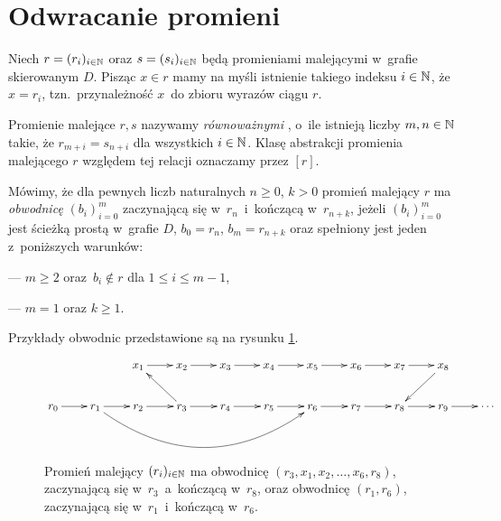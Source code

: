 

\section{Odwracanie promieni}\label{reversing}
Niech $r=(r_i)_{i\in\mathbb{N}}$ oraz $s=(s_i)_{i\in\mathbb{N}}$ będą promieniami malejącymi w~grafie skierowanym $D$. Pisząc $x\in r$ mamy na myśli istnienie takiego indeksu $i\in\mathbb{N}$, że $x=r_i$, tzn.~przynależność $x$~do zbioru wyrazów ciągu $r$.

Promienie malejące $r, s$ nazywamy \textit{równoważnymi} \cite{Ayala11}, o~ile istnieją liczby $m,n\in\mathbb{N}$ takie, że $r_{m+i}=s_{n+i}$ dla wszystkich $i\in\mathbb{N}$. Klasę abstrakcji promienia malejącego $r$ względem tej relacji oznaczamy przez $[r]$.

Mówimy, że dla pewnych liczb naturalnych $n\geq 0$, $k>0$ promień malejący $r$ ma \textit{obwodnicę} $(b_i)_{i=0}^{m}$ zaczynającą się w~$r_n$~i~kończącą w~$r_{n+k}$, jeżeli $(b_i)_{i=0}^{m}$ jest ścieżką prostą w~grafie $D$, $b_0=r_n$, $b_m=r_{n+k}$ oraz spełniony jest jeden z~poniższych warunków:
\begin{compactitem}
\item[---] $m\geq 2$ oraz~$b_i\not\in r$ dla $1\leq i\leq m-1$,
\item[---] $m=1$ oraz $k\geq 1$.
\end{compactitem}

Przykłady obwodnic przedstawione są na rysunku \ref{fig-bypass}. 

\begin{figure}[h]
\centering
$\xymatrix@C=22pt{
& & x_1\ar[r] & x_2\ar[r]& x_3\ar[r]& x_4\ar[r] & x_5\ar[r] & x_6\ar[r] & x_7\ar[r] & x_8\ar[dl] \\ 
r_0\ar[r] & r_1\ar[r]\ar@/_3pc/[rrrrr] & r_2\ar[r] & r_3\ar[r]\ar[ul] & r_4\ar[r] & r_5\ar[r] & r_6\ar[r] & r_7\ar[r] & r_8\ar[r] & r_9\ar[r] & \cdots \\\\}$
\caption{Promień malejący $(r_i)_{i\in\mathbb{N}}$ ma obwodnicę $(r_3,x_1,x_2,\ldots,x_6,r_8)$, zaczynającą się w~$r_3$~a~kończącą w~$r_8$, oraz obwodnicę $(r_1,r_6)$, zaczynającą się w~$r_1$~i~kończącą w~$r_6$.}\label{fig-bypass}
\end{figure}

